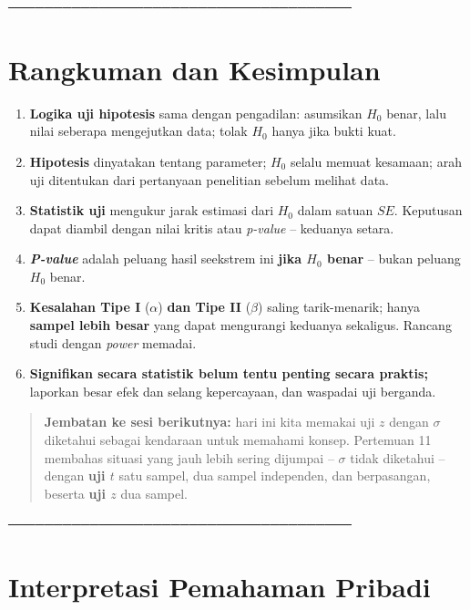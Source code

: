 \documentclass[
  indonesian,
  letterpaper,
]{book}
\begin{document}
──────────────────────────────────────

\section{Rangkuman dan Kesimpulan}\label{rangkuman-dan-kesimpulan-1}

\begin{enumerate}
\def\labelenumi{\arabic{enumi}.}
\item
  \textbf{Logika uji hipotesis} sama dengan pengadilan: asumsikan
  \(H_0\) benar, lalu nilai seberapa mengejutkan data; tolak \(H_0\)
  hanya jika bukti kuat.
\item
  \textbf{Hipotesis} dinyatakan tentang parameter; \(H_0\) selalu memuat
  kesamaan; arah uji ditentukan dari pertanyaan penelitian sebelum
  melihat data.
\item
  \textbf{Statistik uji} mengukur jarak estimasi dari \(H_0\) dalam
  satuan \(SE\). Keputusan dapat diambil dengan nilai kritis atau
  \emph{p-value} -- keduanya setara.
\item
  \textbf{\emph{P-value}} adalah peluang hasil seekstrem ini
  \textbf{jika \(H_0\) benar} -- bukan peluang \(H_0\) benar.
\item
  \textbf{Kesalahan Tipe I} (\(\alpha\)) \textbf{dan Tipe II}
  (\(\beta\)) saling tarik-menarik; hanya \textbf{sampel lebih besar}
  yang dapat mengurangi keduanya sekaligus. Rancang studi dengan
  \emph{power} memadai.
\item
  \textbf{Signifikan secara statistik belum tentu penting secara
  praktis;} laporkan besar efek dan selang kepercayaan, dan waspadai uji
  berganda.
\end{enumerate}

\begin{quote}
\textbf{Jembatan ke sesi berikutnya:} hari ini kita memakai uji \(z\)
dengan \(\sigma\) diketahui sebagai kendaraan untuk memahami konsep.
Pertemuan 11 membahas situasi yang jauh lebih sering dijumpai --
\(\sigma\) tidak diketahui -- dengan \textbf{uji \(t\)} satu sampel, dua
sampel independen, dan berpasangan, beserta \textbf{uji \(z\)} dua
sampel.
\end{quote}

──────────────────────────────────────

\section{Interpretasi Pemahaman
Pribadi}\label{interpretasi-pemahaman-pribadi-1}
\end{document}
